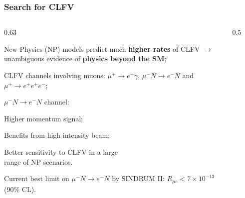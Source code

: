 \documentclass{beamer}
\begin{document}
\begin{frame}
    \frametitle{Search for CLFV}
                \vspace{-2mm}

   \begin{columns}
    \begin{column}{0.63\framewidth}
        \setlength{\leftmargini}{1.3em}
        \begin{itemize}
            {\footnotesize    \item New Physics (NP) models predict much \textbf{higher rates} of CLFV $\rightarrow$ unambiguous evidence of \textbf{physics beyond the SM};
            \vspace{4mm}
            \item CLFV channels involving muons: $\mu^+ \rightarrow e^+ \gamma$, $ \mu^- N \rightarrow e^- N $ and $\mu^+ \rightarrow e^+ e^+ e^-$;
            \vspace{4mm}
            \item $ \mu^- N \rightarrow e^- N $ channel:
            }
            \vspace{1.5mm}
            \begin{itemize}
                {\footnotesize    \item Higher momentum signal;
                \vspace{1.5mm}
                \item Benefits from high intensity beam;
                \vspace{1.5mm}
                \item Better sensitivity to CLFV in a large \\ range of NP scenarios.}
            \end{itemize}
            \vspace{4mm}
            {\footnotesize    \item Current best limit on $\mu^- N \rightarrow e^- N$ by SINDRUM II: $R_{\mu e} < 7 \times 10^{-13}$ (90\% CL).}
        \end{itemize}
    \end{column}
    \begin{column}{0.5\framewidth}
        \begin{figure}[h]
            \centering
            \hspace*{-3.1ex}

\end{figure}
\end{column}
\end{columns}
\end{frame}
\end{document}
